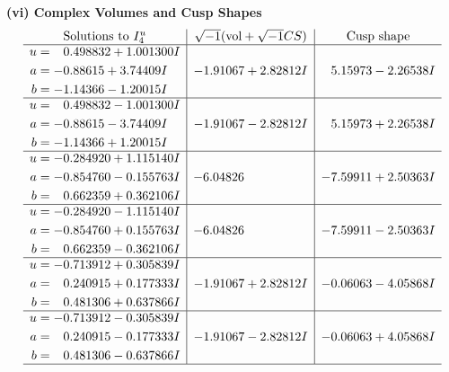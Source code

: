 \documentclass[1p]{elsarticle_modified}
\theoremstyle{definition}
\newcommand{\I}{\sqrt{-1}}
\begin{document}
\newpage\flushleft \textbf{(vi) Complex Volumes and Cusp Shapes}
$$\begin{array}{c|c|c}  
\text{Solutions to }I^u_{4}& \I (\text{vol} + \sqrt{-1}CS) & \text{Cusp shape}\\
 \hline 
\begin{aligned}
u &= \phantom{-}0.498832 + 1.001300 I \\
a &= -0.88615 + 3.74409 I \\
b &= -1.14366 - 1.20015 I\end{aligned}
 & -1.91067 + 2.82812 I & \phantom{-}5.15973 - 2.26538 I \\ \hline\begin{aligned}
u &= \phantom{-}0.498832 - 1.001300 I \\
a &= -0.88615 - 3.74409 I \\
b &= -1.14366 + 1.20015 I\end{aligned}
 & -1.91067 - 2.82812 I & \phantom{-}5.15973 + 2.26538 I \\ \hline\begin{aligned}
u &= -0.284920 + 1.115140 I \\
a &= -0.854760 - 0.155763 I \\
b &= \phantom{-}0.662359 + 0.362106 I\end{aligned}
 & -6.04826\phantom{ +0.000000I} & -7.59911 + 2.50363 I \\ \hline\begin{aligned}
u &= -0.284920 - 1.115140 I \\
a &= -0.854760 + 0.155763 I \\
b &= \phantom{-}0.662359 - 0.362106 I\end{aligned}
 & -6.04826\phantom{ +0.000000I} & -7.59911 - 2.50363 I \\ \hline\begin{aligned}
u &= -0.713912 + 0.305839 I \\
a &= \phantom{-}0.240915 + 0.177333 I \\
b &= \phantom{-}0.481306 + 0.637866 I\end{aligned}
 & -1.91067 + 2.82812 I & -0.06063 - 4.05868 I \\ \hline\begin{aligned}
u &= -0.713912 - 0.305839 I \\
a &= \phantom{-}0.240915 - 0.177333 I \\
b &= \phantom{-}0.481306 - 0.637866 I\end{aligned}
 & -1.91067 - 2.82812 I & -0.06063 + 4.05868 I\\
 \hline 
 \end{array}$$\newpage
\end{document}
